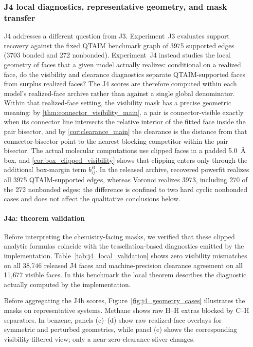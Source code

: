 \documentclass[preprint,12pt]{elsarticle}
\begin{document}


\subsubsection{J4 local diagnostics, representative geometry, and mask transfer}
J4 addresses a different question from J3. Experiment~J3 evaluates support
recovery against the fixed QTAIM benchmark graph of 3975 supported edges
(3703 bonded and 272 nonbonded). Experiment~J4 instead studies the local
geometry of faces that a given model actually realizes: conditional on a
realized face, do the visibility and clearance diagnostics separate
QTAIM-supported faces from surplus realized faces? The J4 scores are therefore
computed within each model's realized-face archive rather than against a
single global denominator. Within that realized-face setting, the visibility
mask has a precise geometric meaning: by
\cref{thm:connector_visibility_main}, a pair is connector-visible exactly when
its connector line intersects the relative interior of the fitted face inside
the pair bisector, and by
\cref{cor:clearance_main} the clearance is the distance from that
connector-bisector point to the nearest blocking competitor within the pair
bisector. The actual molecular computations use clipped faces in a padded
5.0~\AA{} box, and \cref{cor:box_clipped_visibility} shows that clipping enters
only through the additional box-margin term $b_{ij}^B$. In the released
archive, recovered powerfit realizes all 3975 QTAIM-supported edges, whereas
Voronoi realizes 3973, including 270 of the 272 nonbonded edges; the
difference is confined to two hard cyclic nonbonded cases and does not affect
the qualitative conclusions below.

\paragraph{J4a: theorem validation}
Before interpreting the chemistry-facing masks, we verified that these clipped
analytic formulas coincide with the tessellation-based diagnostics emitted by
the implementation. Table~\ref{tab:j4_local_validation} shows zero visibility
mismatches on all 38,746 released J4 faces and machine-precision clearance
agreement on all 11,677 visible faces. In this benchmark the local theorem
describes the diagnostic actually computed by the implementation.




Before aggregating the J4b scores, Figure~\ref{fig:j4_geometry_cases}
illustrates the masks on representative systems. Methane shows raw H--H extras
blocked by C--H separators. In benzene, panels (c)--(d) show raw realized-face
overlays for symmetric and perturbed geometries, while panel (e) shows the
corresponding visibility-filtered view; only a near-zero-clearance sliver
changes.
\end{document}

